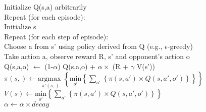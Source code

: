 \begin{center} 
\begin{mdframed}
\begin{algorithm}[H]
Initialize Q(s,a) arbitrarily \\
Repeat (for each episode):\\
\tab Initialize s \\
\tab Repeat (for each step of episode):\\
\dtab Choose a from s' using policy derived from Q (e.g., $\epsilon$-greedy)\\
\dtab Take action a, observe reward R, s' and opponent's action o\\
\dtab Q(s,a,o) $\leftarrow$ (1-$\alpha$) Q(s,a,o) + $\alpha \times$ (R + $\gamma$ V(s'))  \\
\dtab $\pi(s,) \leftarrow \underset{\pi'(s,)}{\text{argmax }} \left\{ \underset{o'}{\text{min}} \left\{ \sum_{a'}  \left\{ \pi(s,a') \times Q(s,a',o') \right\} \right\} \right\}$ \\
\dtab $ V(s) \leftarrow \underset{o'}{\text{min}} \left\{ \sum_{a'}  \left\{ \pi(s,a') \times Q(s,a',o') \right\} \right\}  $ \\
\dtab $\alpha \leftarrow \alpha \times decay$
\end{algorithm}
\end{mdframed}
\label{alg:minmax}
\end{center}


